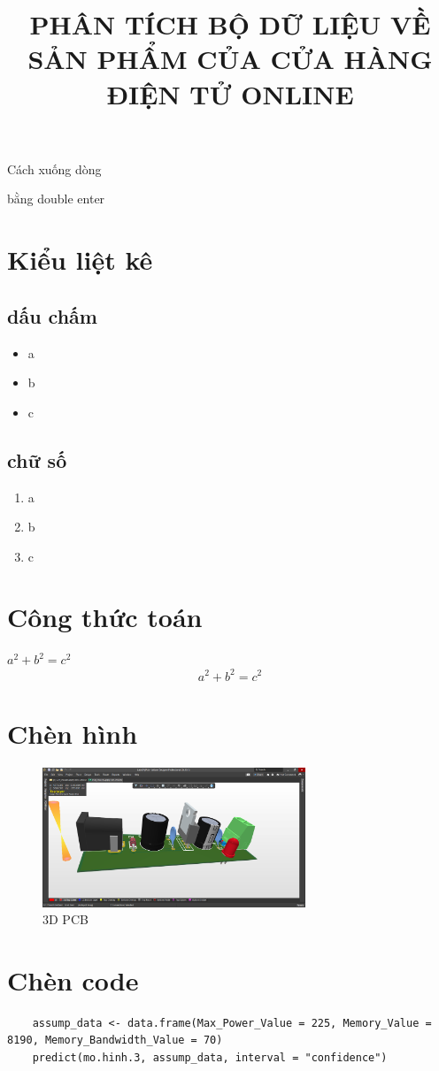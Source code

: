 \documentclass[twoside, final]{hcmut_report}
\title{PHÂN TÍCH BỘ DỮ LIỆU VỀ SẢN PHẨM CỦA CỬA HÀNG ĐIỆN TỬ ONLINE}
\begin{document}
\begin{titlepage}
    \coverpage
\end{titlepage}
\newpage
\setcounter{page}{1}
\pagestyle{empty}
\tableofcontents
\pagestyle{fancy}
\pagebreak
Cách xuống dòng

bằng double enter
\section{Kiểu liệt kê}
\subsection{dấu chấm}

\begin{itemize}
    \item a 
    \item b 
    \item c 
\end{itemize}

\subsection{chữ số}
\begin{enumerate}
    \item a 
    \item b 
    \item c
\end{enumerate}

\section{Công thức toán}
$a^2+b^2=c^2$
$$a^2+b^2=c^2$$

\section{Chèn hình}
\begin{figure}[!htbp]
    \centering
    \includegraphics[width=0.7\textwidth]{graphics/f5.PNG}
    \caption{3D PCB}
\end{figure}

\section{Chèn code}
\begin{lstlisting}
    assump_data <- data.frame(Max_Power_Value = 225, Memory_Value = 8190, Memory_Bandwidth_Value = 70)
    predict(mo.hinh.3, assump_data, interval = "confidence")
\end{lstlisting}
\end{document}
